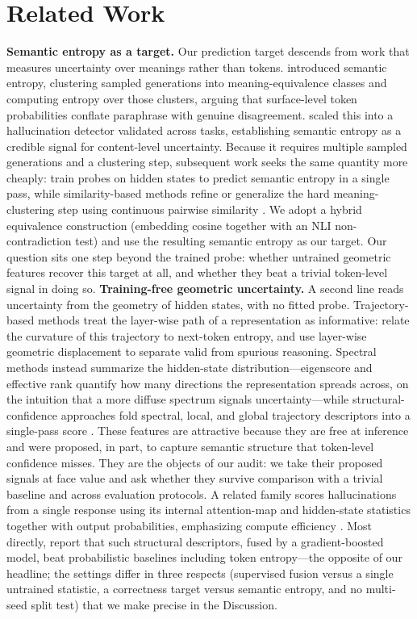 \documentclass[11pt]{article}
\begin{document}
\section{Related Work}
\textbf{Semantic entropy as a target.} Our prediction target descends from work that measures uncertainty over meanings rather than tokens. \citet{kuhn2023semantic} introduced semantic entropy, clustering sampled generations into meaning-equivalence classes and computing entropy over those clusters, arguing that surface-level token probabilities conflate paraphrase with genuine disagreement. \citet{farquhar2024detecting} scaled this into a hallucination detector validated across tasks, establishing semantic entropy as a credible signal for content-level uncertainty. Because it requires multiple sampled generations and a clustering step, subsequent work seeks the same quantity more cheaply: \citet{kossen2024semantic} train probes on hidden states to predict semantic entropy in a single pass, while similarity-based methods refine or generalize the hard meaning-clustering step using continuous pairwise similarity \citep{nguyen2025beyond,nikitin2024kernel}. We adopt a hybrid equivalence construction (embedding cosine together with an NLI non-contradiction test) and use the resulting semantic entropy as our target. Our question sits one step beyond the trained probe: whether untrained geometric features recover this target at all, and whether they beat a trivial token-level signal in doing so.
\textbf{Training-free geometric uncertainty.} A second line reads uncertainty from the geometry of hidden states, with no fitted probe. Trajectory-based methods treat the layer-wise path of a representation as informative: \citet{king2026representational} relate the curvature of this trajectory to next-token entropy, and \citet{damirchi2026truth} use layer-wise geometric displacement to separate valid from spurious reasoning. Spectral methods instead summarize the hidden-state distribution---eigenscore \citep{chen2024inside} and effective rank \citep{wang2025revisiting} quantify how many directions the representation spreads across, on the intuition that a more diffuse spectrum signals uncertainty---while structural-confidence approaches fold spectral, local, and global trajectory descriptors into a single-pass score \citep{yang2026trust}. These features are attractive because they are free at inference and were proposed, in part, to capture semantic structure that token-level confidence misses. They are the objects of our audit: we take their proposed signals at face value and ask whether they survive comparison with a trivial baseline and across evaluation protocols. A related family scores hallucinations from a single response using its internal attention-map and hidden-state statistics together with output probabilities, emphasizing compute efficiency \citep{sriramanan2024llmcheck}. Most directly, \citet{yang2026trust} report that such structural descriptors, fused by a gradient-boosted model, beat probabilistic baselines including token entropy---the opposite of our headline; the settings differ in three respects (supervised fusion versus a single untrained statistic, a correctness target versus semantic entropy, and no multi-seed split test) that we make precise in the Discussion.
\end{document}
